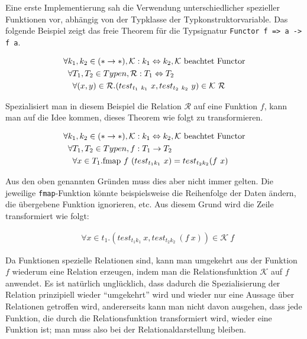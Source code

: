 Eine erste Implementierung sah die Verwendung unterschiedlicher spezieller Funktionen vor, abhängig von der Typklasse der
Typkonstruktorvariable. Das folgende Beispiel zeigt das freie Theorem für die Typsignatur \texttt{Functor f => a -> f a}.

\begin{align*}
& \forall k_1, k_2 \in (* \rightarrow *), \mathcal{K} : k_1 \Leftrightarrow k_2, \mathcal{K}\ \text{beachtet Functor} \\
& \hphantom{\forall} \forall T_1, T_2 \in Typen, \mathcal{R} : T_1 \Leftrightarrow T_2 \\
& \hphantom{\forall \forall} \forall (x, y) \in \mathcal{R} . (test_{t_1\ k_1}\ x, test_{t_2\ k_2}\ y) \in \mathcal{K}\ \mathcal{R}
\end{align*}

Spezialisiert man in diesem Beispiel die Relation $\mathcal{R}$ auf eine Funktion $f$, kann man auf die Idee kommen, dieses Theorem
wie folgt zu transformieren.

\begin{align*}
& \forall k_1, k_2 \in (* \rightarrow *), \mathcal{K} : k_1 \Leftrightarrow k_2, \mathcal{K}\ \text{beachtet Functor} \\
& \hphantom{\forall} \forall T_1, T_2 \in Typen, f : T_1 \rightarrow T_2 \\
& \hphantom{\forall \forall} \forall x \in T_1 . \text{fmap}\ f\ (test_{t_1 k_1}\ x) = test_{t_2 k_2} (f\ x)
\end{align*}

Aus den oben genannten Gründen muss dies aber nicht immer gelten. Die jeweilige \texttt{fmap}-Funktion könnte beispielsweise
die Reihenfolge der Daten ändern, die übergebene Funktion ignorieren, etc.
Aus diesem Grund wird die Zeile transformiert wie folgt:

\begin{align*}
& \forall x \in t_1 . (test_{t_1 k_1}\ x, test_{t_2 k_2}\ (f\ x)) \in \mathcal{K}\ f
\end{align*}

Da Funktionen spezielle Relationen sind, kann man umgekehrt aus der Funktion $f$ wiederum eine Relation erzeugen, indem
man die Relationsfunktion $\mathcal{K}$ auf $f$ anwendet. Es ist natürlich unglücklich, dass dadurch die Spezialisierung
der Relation prinzipiell wieder ``umgekehrt'' wird und wieder nur eine Aussage über Relationen getroffen wird, andererseits
kann man nicht davon ausgehen, dass jede Funktion, die durch die Relationsfunktion transformiert wird, wieder eine Funktion ist;
man muss also bei der Relationaldarstellung bleiben.

